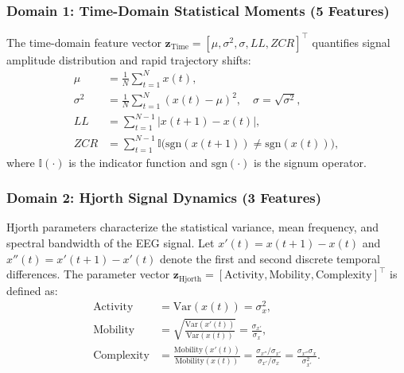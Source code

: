 \documentclass[pdflatex,sn-mathphys-num]{sn-jnl}
\begin{document}
\subsubsection{Domain 1: Time-Domain Statistical Moments (5 Features)}
The time-domain feature vector $\mathbf{z}_{\text{Time}} = [\mu, \sigma^2, \sigma, LL, ZCR]^\top$ quantifies signal amplitude distribution and rapid trajectory shifts:
\begin{align}
\mu &= \frac{1}{N} \sum_{t=1}^N x(t), \label{eq:mean} \\
\sigma^2 &= \frac{1}{N} \sum_{t=1}^N \left( x(t) - \mu \right)^2, \quad \sigma = \sqrt{\sigma^2}, \label{eq:var} \\
LL &= \sum_{t=1}^{N-1} \left| x(t+1) - x(t) \right|, \label{eq:line_length} \\
ZCR &= \sum_{t=1}^{N-1} \mathbb{I}\Big( \text{sgn}(x(t+1)) \neq \text{sgn}(x(t)) \Big), \label{eq:zcr}
\end{align}
where $\mathbb{I}(\cdot)$ is the indicator function and $\text{sgn}(\cdot)$ is the signum operator.

\subsubsection{Domain 2: Hjorth Signal Dynamics (3 Features)}
Hjorth parameters \cite{hjorth1970eeg,kumar2024hjorth} characterize the statistical variance, mean frequency, and spectral bandwidth of the EEG signal. Let $x'(t) = x(t+1) - x(t)$ and $x''(t) = x'(t+1) - x'(t)$ denote the first and second discrete temporal differences. The parameter vector $\mathbf{z}_{\text{Hjorth}} = [\text{Activity}, \text{Mobility}, \text{Complexity}]^\top$ is defined as:
\begin{align}
\text{Activity} &= \text{Var}(x(t)) = \sigma_x^2, \label{eq:hjorth_act} \\
\text{Mobility} &= \sqrt{\frac{\text{Var}(x'(t))}{\text{Var}(x(t))}} = \frac{\sigma_{x'}}{\sigma_x}, \label{eq:hjorth_mob} \\
\text{Complexity} &= \frac{\text{Mobility}(x'(t))}{\text{Mobility}(x(t))} = \frac{\sigma_{x''}/\sigma_{x'}}{\sigma_{x'}/\sigma_x} = \frac{\sigma_{x''} \sigma_x}{\sigma_{x'}^2}. \label{eq:hjorth_comp}
\end{align}
\end{document}
